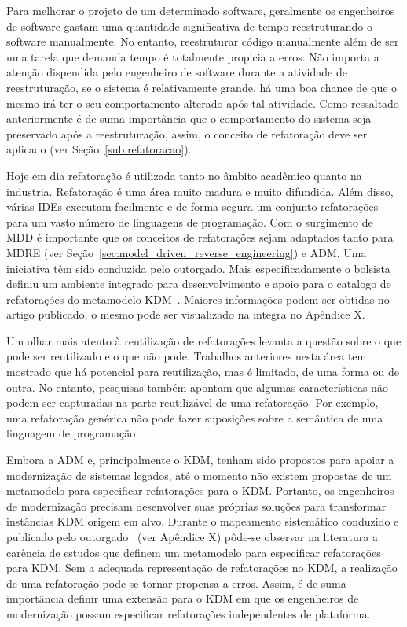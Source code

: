 Para melhorar o projeto de um determinado software, geralmente os engenheiros de software gastam uma quantidade significativa de tempo reestruturando o software manualmente. No entanto, reestruturar código manualmente além de ser uma tarefa que demanda tempo é totalmente propicia a erros. Não importa a atenção dispendida pelo engenheiro de software durante a atividade de reestruturação, se o sistema é relativamente grande, há uma boa chance de que o mesmo irá ter o seu comportamento alterado após tal atividade. Como ressaltado anteriormente é de suma importância que o comportamento do sistema seja preservado após a reestruturação, assim, o conceito de refatoração deve ser aplicado (ver Seção~\ref{sub:refatoracao}).

 Hoje em dia refatoração é utilizada tanto no âmbito acadêmico quanto na industria. Refatoração é uma área muito madura e muito difundida. Além disso, várias IDEs executam facilmente e de forma segura um conjunto refatorações para um vasto número de linguagens de programação. Com o surgimento de MDD é importante que os conceitos de refatorações sejam adaptados tanto para MDRE (ver Seção~\ref{sec:model_driven_reverse_engineering}) e ADM. Uma iniciativa têm sido conduzida pelo outorgado. Mais especificadamente o bolsista definiu um ambiente integrado para desenvolvimento e apoio para o catalogo de refatorações do metamodelo KDM~\citep{KDM_RE_A_Model_Driven_Refactoring_Tool_for_KDM}. Maiores informações podem ser obtidas no artigo publicado, o mesmo pode ser visualizado na integra no Apêndice X.

Um olhar mais atento à reutilização de refatorações levanta a questão sobre o que pode ser reutilizado e o que não pode. Trabalhos anteriores nesta área tem mostrado que há potencial para reutilização, mas é limitado, de uma forma ou de outra. No entanto, pesquisas também apontam que algumas características não podem ser capturadas na parte reutilizável de uma refatoração. Por exemplo, uma refatoração genérica não pode fazer suposições sobre a semântica de uma linguagem de programação. 

Embora a ADM e, principalmente o KDM, tenham sido propostos para apoiar a modernização de sistemas legados, até o momento não existem propostas de um metamodelo para especificar refatorações para o KDM. Portanto, os engenheiros de modernização precisam desenvolver suas próprias soluções para transformar instâncias KDM origem em alvo. Durante o mapeamento sistemático conduzido e publicado pelo outorgado~\citep{iri_systematic_mapping_ADM_2014} (ver Apêndice X) pôde-se observar na literatura a carência de estudos que definem um metamodelo para especificar refatorações para KDM. Sem a adequada representação de refatorações no KDM, a realização de uma refatoração pode se tornar propensa a erros. Assim, é de suma importância definir uma extensão para o KDM em que os engenheiros de modernização possam especificar refatorações independentes de plataforma.

